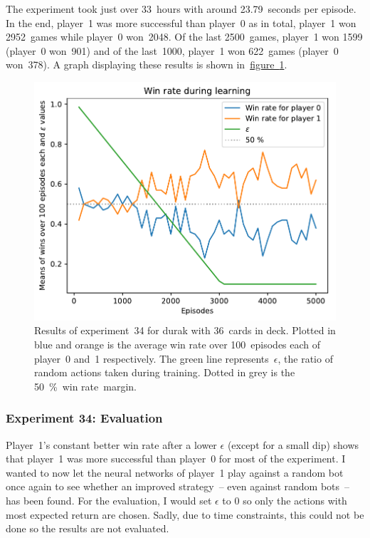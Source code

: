 \documentclass[a4paper,titlepage]{article}
\begin{document}
The experiment took just over 33~hours with around 23.79~seconds per episode. In the end, player~1 was more successful than player~0 as in total, player~1 won 2952~games while player~0 won~2048. Of the last 2500~games, player~1 won 1599 (player~0 won~901) and of the last~1000, player~1 won 622~games (player~0 won~378). A graph displaying these results is shown in~\hyperref[fig:exp34]{figure~\ref*{fig:exp34}}.
\begin{figure}[p]
  \centering
  \includegraphics[width=\textwidth]{../experiments/exp34/win_stats.pdf}
  \caption{Results of experiment~34 for durak with 36~cards in deck. Plotted in blue and orange is the average win rate over 100~episodes each of player~0 and~1 respectively. The green line represents~$\epsilon$, the ratio of random actions taken during training. Dotted in grey is the 50~\%~win rate~margin.}
  \label{fig:exp34}
\end{figure}

\subsubsection*{Experiment 34: Evaluation}

Player~1's constant better win rate after a lower $\epsilon$ (except for a small dip) shows that player~1 was more successful than player~0 for most of the experiment. I wanted to now let the neural networks of player~1 play against a random bot once again to see whether an improved strategy~-- even against random bots~-- has been found. For the evaluation, I would set $\epsilon$ to 0 so only the actions with most expected return are chosen. Sadly, due to time constraints, this could not be done so the results are not evaluated.
\end{document}
